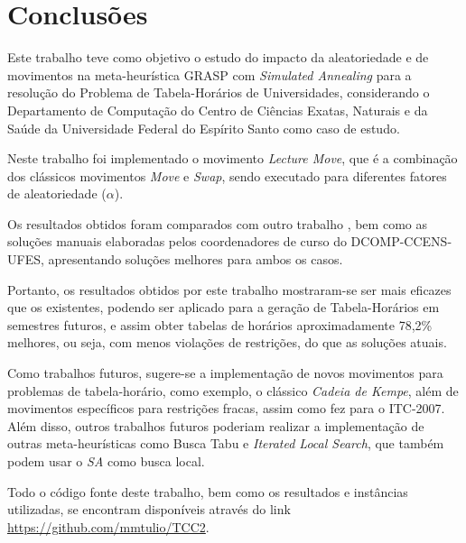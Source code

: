 \chapter{Conclusões}
\label{sec-conclusoes}

Este trabalho teve como objetivo o estudo do impacto da aleatoriedade e de movimentos na meta-heurística GRASP com \textit{Simulated Annealing} para a resolução do Problema de Tabela-Horários de Universidades, considerando o Departamento de Computação do Centro de Ciências Exatas, Naturais e da Saúde da Universidade Federal do Espírito Santo como caso de estudo.

Neste trabalho foi implementado o movimento \textit{Lecture Move}, que é a combinação dos clássicos movimentos \textit{Move} e \textit{Swap}, sendo executado para diferentes fatores de aleatoriedade (\(\alpha\)).

Os resultados obtidos foram comparados com outro trabalho \cite{vital2015grasp}, bem como as soluções manuais elaboradas pelos coordenadores de curso do DCOMP-CCENS-UFES, apresentando soluções melhores para ambos os casos.

Portanto, os resultados obtidos por este trabalho mostraram-se ser mais eficazes que os existentes, podendo ser aplicado para a geração de Tabela-Horários em semestres futuros, e assim obter tabelas de horários aproximadamente 78,2\% melhores, ou seja, com menos violações de restrições, do que as soluções atuais.

Como trabalhos futuros, sugere-se a implementação de novos movimentos para problemas de tabela-horário, como exemplo, o clássico \textit{Cadeia de Kempe}, além de movimentos específicos para restrições fracas, assim como  fez para o ITC-2007.
Além disso, outros trabalhos futuros poderiam realizar a implementação de outras meta-heurísticas como Busca Tabu e \textit{Iterated Local Search}, que também podem usar o \textit{SA} como busca local.

Todo o código fonte deste trabalho, bem como os resultados e instâncias utilizadas, se encontram disponíveis através do link \href{https://github.com/mmtulio/TCC2}{https://github.com/mmtulio/TCC2}.